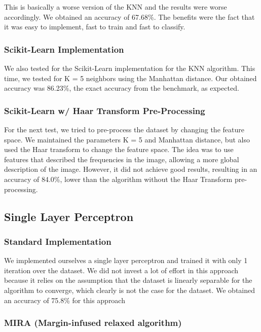 \documentclass[twoside,twocolumn]{article}
\begin{document}
This is basically a worse version of the KNN and the results were worse accordingly.
We obtained an accuracy of 67.68\%.
The benefits were the fact that it was easy to implement, fast to train and fast to classify.

\subsubsection{Scikit-Learn Implementation}

We also tested for the Scikit-Learn implementation for the KNN algorithm.
This time, we tested for K = 5 neighbors using the Manhattan distance.
Our obtained accuracy was 86.23\%, the exact accuracy from the benchmark, as expected.

\subsubsection{Scikit-Learn w/ Haar Transform Pre-Processing}

For the next test, we tried to pre-process the dataset by changing the feature space. We  maintained the parameters K = 5 and
Manhattan distance, but also used the Haar transform to change the feature space. The idea was to use features that described the frequencies
in the image, allowing a more global description of the image. However, it did not achieve good results, resulting in an accuracy of 84.0\%, lower than
the algorithm without the Haar Transform pre-processing.

\subsection{Single Layer Perceptron}

\subsubsection{Standard Implementation}

We implemented ourselves a single layer perceptron and trained it with only 1 iteration over the dataset.
We did not invest a lot of effort in this approach because it relies on the assumption that the dataset
is linearly separable for the algorithm to converge, which clearly is not the case for the dataset.
We obtained an accuracy of 75.8\% for this approach

\subsubsection{MIRA (Margin-infused relaxed algorithm)}
\end{document}
